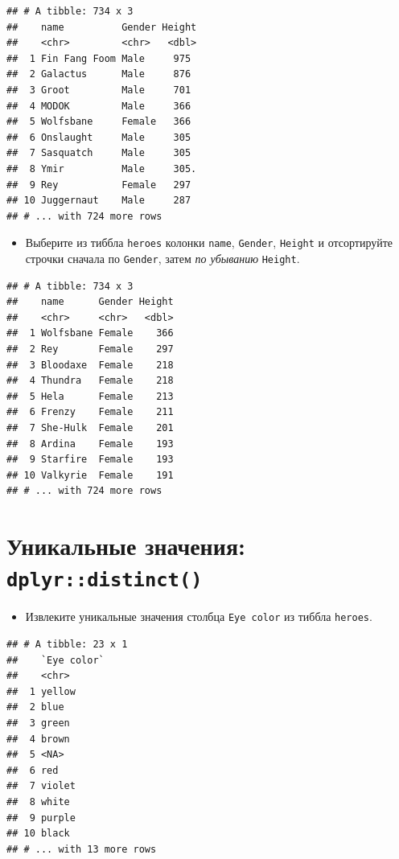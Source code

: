 \documentclass[]{book}
\providecommand{\tightlist}{%
  \setlength{\itemsep}{0pt}\setlength{\parskip}{0pt}}
\begin{document}
\begin{verbatim}
## # A tibble: 734 x 3
##    name          Gender Height
##    <chr>         <chr>   <dbl>
##  1 Fin Fang Foom Male     975 
##  2 Galactus      Male     876 
##  3 Groot         Male     701 
##  4 MODOK         Male     366 
##  5 Wolfsbane     Female   366 
##  6 Onslaught     Male     305 
##  7 Sasquatch     Male     305 
##  8 Ymir          Male     305.
##  9 Rey           Female   297 
## 10 Juggernaut    Male     287 
## # ... with 724 more rows
\end{verbatim}

\begin{itemize}
\tightlist
\item
  Выберите из тиббла \texttt{heroes} колонки \texttt{name},
  \texttt{Gender}, \texttt{Height} и отсортируйте строчки сначала по
  \texttt{Gender}, затем \emph{по убыванию} \texttt{Height}.
\end{itemize}

\begin{verbatim}
## # A tibble: 734 x 3
##    name      Gender Height
##    <chr>     <chr>   <dbl>
##  1 Wolfsbane Female    366
##  2 Rey       Female    297
##  3 Bloodaxe  Female    218
##  4 Thundra   Female    218
##  5 Hela      Female    213
##  6 Frenzy    Female    211
##  7 She-Hulk  Female    201
##  8 Ardina    Female    193
##  9 Starfire  Female    193
## 10 Valkyrie  Female    191
## # ... with 724 more rows
\end{verbatim}

\section{\texorpdfstring{Уникальные значения:
\texttt{dplyr::distinct()}}{Уникальные значения: dplyr::distinct()}}\label{task_dist}

\begin{itemize}
\tightlist
\item
  Извлеките уникальные значения столбца \texttt{Eye\ color} из тиббла
  \texttt{heroes}.
\end{itemize}

\begin{verbatim}
## # A tibble: 23 x 1
##    `Eye color`
##    <chr>      
##  1 yellow     
##  2 blue       
##  3 green      
##  4 brown      
##  5 <NA>       
##  6 red        
##  7 violet     
##  8 white      
##  9 purple     
## 10 black      
## # ... with 13 more rows
\end{verbatim}
\end{document}
